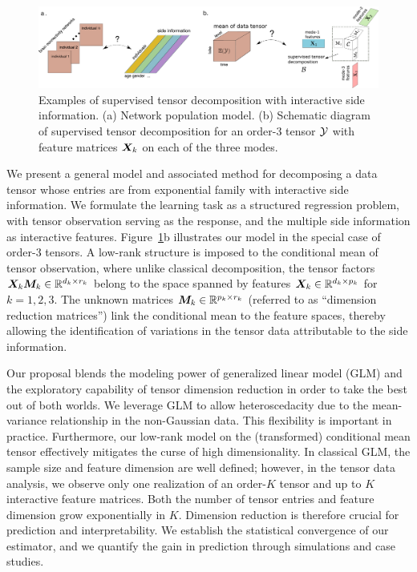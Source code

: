 \documentclass[12pt]{article}
\theoremstyle{definition}
\theoremstyle{definition}
\begin{document}
\begin{figure}[t]
\begin{center}
\includegraphics[width=16cm]{demo.pdf}
\end{center}
\caption{Examples of supervised tensor decomposition with interactive side information. (a) Network population model. (b) Schematic diagram of supervised tensor decomposition for an order-3 tensor $\mathcal{Y}$ with feature matrices $\bm X_k$ on each of the three modes.} \label{fig:intro1}
\end{figure}

We present a general model and associated method for decomposing a data tensor whose entries are from exponential family with interactive side information. We formulate the learning task as a structured regression problem, with tensor observation serving as the response, and the multiple side information as interactive features. Figure~\ref{fig:intro1}b illustrates our model in the special case of order-3 tensors. A low-rank structure is imposed to the conditional mean of tensor observation, where unlike classical decomposition, the tensor factors $\bm X_k\bm M_k\in\mathbb{R}^{d_k\times r_k}$ belong to the space spanned by features $\bm X_k\in\mathbb{R}^{d_k\times p_k}$ for $k=1,2,3$. The unknown matrices $\bm M_k\in\mathbb{R}^{p_k\times r_k}$ (referred to as ``dimension reduction matrices'') link the conditional mean to the feature spaces, thereby allowing the identification of variations in the tensor data attributable to the side information.


Our proposal blends the modeling power of generalized linear model (GLM) and the exploratory capability of tensor dimension reduction in order to take the best out of both worlds. We leverage GLM to allow heteroscedacity due to the mean-variance relationship in the non-Gaussian data. This flexibility is important in practice. Furthermore, our low-rank model on the (transformed) conditional mean tensor effectively mitigates the curse of high dimensionality. In classical GLM, the sample size and feature dimension are well defined; however, in the tensor data analysis, we observe only one realization of an order-$K$ tensor and up to $K$ interactive feature matrices. Both the number of tensor entries and feature dimension grow exponentially in $K$. Dimension reduction is therefore crucial for prediction and interpretability. We establish the statistical convergence of our estimator, and we quantify the gain in prediction through simulations and case studies. 
 
\end{document}
